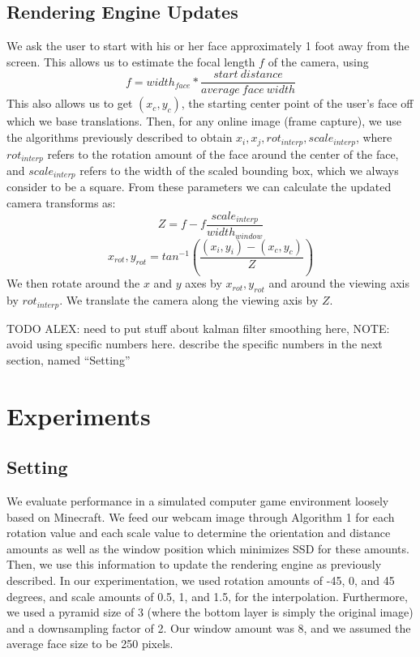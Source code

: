 \documentclass[10pt,twocolumn,letterpaper]{article}
\begin{document}
\subsection*{Rendering Engine Updates}
We ask the user to start with his or her face approximately 1 foot away from the screen. This allows us to estimate the focal length $f$ of the camera, using
$$f = width_{face} * \frac{start\ distance}{average\ face\ width}$$
This also allows us to get $(x_c, y_c)$, the starting center point of the user's face off which we base translations.
Then, for any online image (frame capture), we use the algorithms previously described to obtain $x_i, x_j, rot_{interp}, scale_{interp}$, where $rot_{interp}$ refers to the rotation amount of the face around the center of the face, and $scale_{interp}$ refers to the width of the scaled bounding box, which we always consider to be a square. From these parameters we can calculate the updated camera transforms as:
$$Z = f - f \frac{scale_{interp}}{width_{window}}$$
$$x_{rot}, y_{rot} = tan^{-1}(\frac{(x_i,y_i)-(x_c,y_c)}{Z})$$
We then rotate around the $x$ and $y$ axes by $x_{rot}, y_{rot}$ and around the viewing axis by $rot_{interp}$. We translate the camera along the viewing axis by $Z$.

TODO ALEX: need to put stuff about kalman filter smoothing here, 
NOTE: avoid using specific numbers here. describe the specific numbers in
the next section, named ``Setting''

\section{Experiments}

\subsection*{Setting}
We evaluate performance in a simulated computer game environment loosely based
on Minecraft. We feed our webcam image through Algorithm 1 for each rotation
value and each scale value to determine the orientation and distance amounts as well as
the window position which minimizes SSD for these amounts. Then, we use this
information to update the rendering engine as previously described. In our experimentation,
we used rotation amounts of -45, 0, and 45 degrees, and scale amounts of 0.5, 1, and 1.5,
for the interpolation. Furthermore, we used a pyramid size of 3 (where the bottom
layer is simply the original image) and a downsampling factor of 2. Our window amount
was 8, and we assumed the average face size to be 250 pixels.
\end{document}
